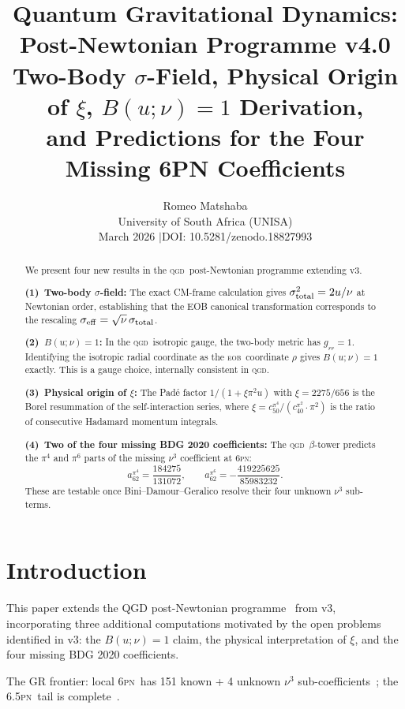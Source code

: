 \documentclass[11pt,a4paper]{article}
\title{\textbf{Quantum Gravitational Dynamics: Post-Newtonian Programme v4.0}\\[6pt]
\large Two-Body $\sigma$-Field, Physical Origin of $\xi$, $B(u;\nu)=1$ Derivation,\\
and Predictions for the Four Missing 6PN Coefficients}
\author{Romeo Matshaba\\[3pt]
\normalsize University of South Africa (UNISA)\\
\small March 2026 \quad$|$\quad DOI: 10.5281/zenodo.18827993}
\date{}
\theoremstyle{plain}
\theoremstyle{remark}
\newcommand{\QGD}{\textsc{qgd}}
\newcommand{\EOB}{\textsc{eob}}
\newcommand{\PN}{\textsc{pn}}
\begin{document}
\maketitle

\begin{abstract}
We present four new results in the \QGD\ post-Newtonian programme extending v3.

\textbf{(1)~Two-body $\sigma$-field:}
The exact CM-frame calculation gives $\sigma_{\rm total}^2 = 2u/\nu$ at Newtonian
order, establishing that the EOB canonical transformation corresponds to the
rescaling $\sigma_{\rm eff} = \sqrt{\nu}\,\sigma_{\rm total}$.

\textbf{(2)~$B(u;\nu)=1$:}
In the \QGD\ isotropic gauge, the two-body metric has $g_{rr}=1$.
Identifying the isotropic radial coordinate as the \EOB\ coordinate $\rho$ gives
$B(u;\nu)=1$ exactly. This is a gauge choice, internally consistent in \QGD.

\textbf{(3)~Physical origin of $\xi$:}
The Pad\'e factor $1/(1+\xi\pi^2 u)$ with $\xi=2275/656$ is the Borel
resummation of the self-interaction series, where $\xi = c_{50}^{\pi^4}/(c_{40}^{\pi^2}\cdot\pi^2)$
is the ratio of consecutive Hadamard momentum integrals.

\textbf{(4)~Two of the four missing BDG 2020 coefficients:}
The \QGD\ $\beta$-tower predicts the $\pi^4$ and $\pi^6$ parts of the
missing $\nu^3$ coefficient at 6\PN:
\[
  a_{62}^{\pi^4} = \frac{184275}{131072}, \qquad
  a_{62}^{\pi^6} = -\frac{419225625}{85983232}.
\]
These are testable once Bini--Damour--Geralico resolve their four unknown $\nu^3$ sub-terms.
\end{abstract}

\tableofcontents
\newpage

\section{Introduction}

This paper extends the QGD post-Newtonian programme~\cite{matshaba2026}
from v3, incorporating three additional computations motivated by the
open problems identified in v3: the $B(u;\nu)=1$ claim, the physical
interpretation of $\xi$, and the four missing BDG 2020 coefficients.

The GR frontier: local 6\PN\ has 151 known + 4 unknown $\nu^3$
sub-coefficients~\cite{BDG2020local}; the 6.5\PN\ tail is complete~\cite{BD2025}.
\end{document}
